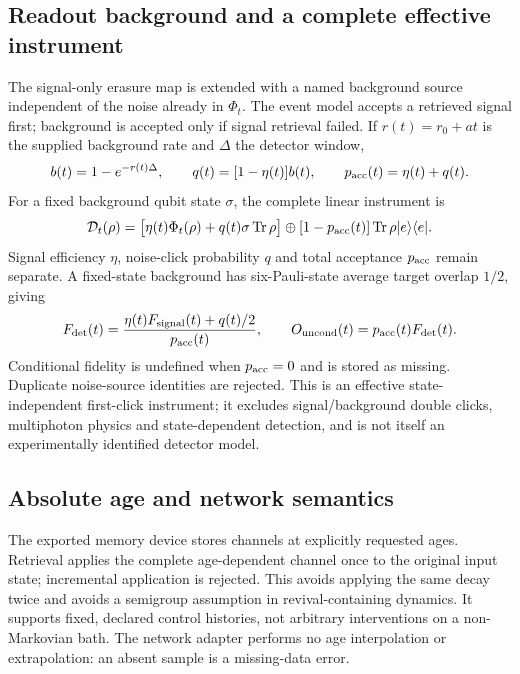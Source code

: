 \documentclass[11pt,a4paper]{article}
\newcommand{\Tr}{\operatorname{Tr}}
\newcommand{\ket}[1]{\lvert #1\rangle}
\newcommand{\bra}[1]{\langle #1\rvert}
\begin{document}
\subsection{Readout background and a complete effective instrument}
\label{sec:readoutnoise}
The signal-only erasure map is extended with a named background source independent of the noise already in $\Phi_t$. The event model accepts a retrieved signal first; background is accepted only if signal retrieval failed. If $r(t)=r_0+at$ is the supplied background rate and $\Delta$ the detector window,
\begin{equation}
b(t)=1-e^{-r(t)\Delta},\qquad q(t)=[1-\eta(t)]b(t),\qquad p_{\rm acc}(t)=\eta(t)+q(t).
\label{eq:noiseprobability}
\end{equation}
For a fixed background qubit state $\sigma$, the complete linear instrument is
\begin{equation}
\mathcal D_t(\rho)=\big[\eta(t)\Phi_t(\rho)+q(t)\sigma\Tr\rho\big]
\oplus[1-p_{\rm acc}(t)]\Tr\rho\ket e\bra e.
\label{eq:detectedinstrument}
\end{equation}
Signal efficiency $\eta$, noise-click probability $q$ and total acceptance $p_{\rm acc}$ remain separate. A fixed-state background has six-Pauli-state average target overlap $1/2$, giving
\begin{equation}
F_{\rm det}(t)=\frac{\eta(t)F_{\rm signal}(t)+q(t)/2}{p_{\rm acc}(t)},\qquad
O_{\rm uncond}(t)=p_{\rm acc}(t)F_{\rm det}(t).
\label{eq:detectedfidelity}
\end{equation}
Conditional fidelity is undefined when $p_{\rm acc}=0$ and is stored as missing. Duplicate noise-source identities are rejected. This is an effective state-independent first-click instrument; it excludes signal/background double clicks, multiphoton physics and state-dependent detection, and is not itself an experimentally identified detector model.

\subsection{Absolute age and network semantics}
The exported memory device stores channels at explicitly requested ages. Retrieval applies the complete age-dependent channel once to the original input state; incremental application is rejected. This avoids applying the same decay twice and avoids a semigroup assumption in revival-containing dynamics. It supports fixed, declared control histories, not arbitrary interventions on a non-Markovian bath. The network adapter performs no age interpolation or extrapolation: an absent sample is a missing-data error.
\end{document}
